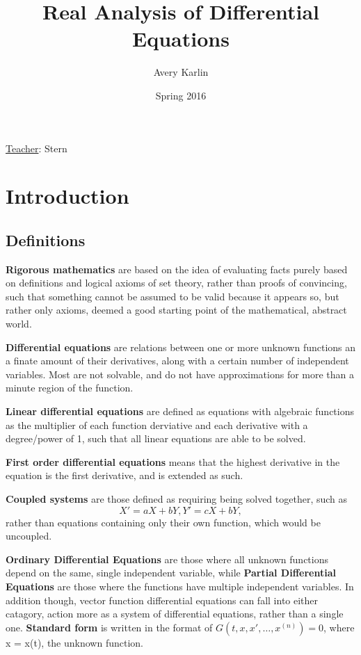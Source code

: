 \documentclass[11 pt, twoside]{article}
\begin{document}
\title{Real Analysis of Differential Equations}
\author{Avery Karlin}
\date{Spring 2016}
\newcommand{\teacher}{Stern}

\maketitle
\newpage
\hypertarget{content}{\tableofcontents}
\vspace{11pt}
\noindent
\underline{Teacher}: \teacher
\newpage

\section{Introduction}

\subsection{Definitions}
\textbf{Rigorous mathematics} are based on the idea of evaluating facts purely based on definitions and logical axioms of set theory, rather than proofs of convincing, such that something cannot be assumed to be valid because it appears so, but rather only axioms, deemed a good starting point of the mathematical, abstract world.

\textbf{Differential equations} are relations between one or more unknown functions an a finate amount of their derivatives, along with a certain number of independent variables. Most are not solvable, and do not have approximations for more than a minute region of the function.

\textbf{Linear differential equations} are defined as equations with algebraic functions as the multiplier of each function derviative and each derivative with a degree/power of 1, such that all linear equations are able to be solved.

\textbf{First order differential equations} means that the highest derivative in the equation is the first derivative, and is extended as such.

\textbf{Coupled systems} are those defined as requiring being solved together, such as $$X' = aX + bY, Y' = cX + bY,$$ rather than equations containing only their own function, which would be uncoupled.

\textbf{Ordinary Differential Equations} are those where all unknown functions depend on the same, single independent variable, while \textbf{Partial Differential Equations} are those where the functions have multiple independent variables. In addition though, vector function differential equations can fall into either catagory, action more as a system of differential equations, rather than a single one. \textbf{Standard form} is written in the format of $G(t, x, x', \dots, x^{(n)}) = 0$, where x = x(t), the unknown function.
\end{document}
